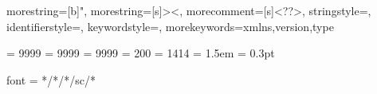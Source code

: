 {
  morestring=[b]",
  morestring=[s]{>}{<},
  morecomment=[s]{<?}{?>},
  stringstyle=\color{black},
  identifierstyle=\color{darkblue},
  keywordstyle=\color{cyan},
  morekeywords={xmlns,version,type}%
}



\setlength{\parskip}{0.5ex plus0.0ex minus0ex} %
\setlength{\itemsep}{0ex minus0.2ex} %
\setlength{\parindent}{0em} %



\clubpenalty = 9999	           %
\widowpenalty = 9999         %
\displaywidowpenalty = 9999
\tolerance = 200
\hbadness = 1414
\emergencystretch = 1.5em
\hfuzz = 0.3pt

\RequirePackage[protrusion=true,%
expansion=true,%
babel=true,%
tracking=true,%
spacing=false]{microtype}     

% 
       { font = */*/*/sc/* }%



\makeatletter
\renewenvironment{thebibliography}[1]
{\subsection*{\refname}%
\@mkboth{\MakeUppercase\refname}{\MakeUppercase\refname}%
\list{\@biblabel{\@arabic\c@enumiv}}%
{\settowidth\labelwidth{\@biblabel{#1}}%
\leftmargin\labelwidth
\setlength{\bibhang}{2em}
\setlength{\bibindent}{3em}
\@openbib@code
\usecounter{enumiv}%
\let\p@enumiv\@empty
\renewcommand\theenumiv{\@arabic\c@enumiv}}%
\clubpenalty4000
\@clubpenalty \clubpenalty
\widowpenalty4000%
\sfcode`\.\@m}
{\def\@noitemerr
{\@latex@warning{Empty `thebibliography' environment}}%
\endlist}
\makeatother

\makeatletter
\renewcommand*\bib@heading{%
  \subsection{\refname}%
}
\makeatother

